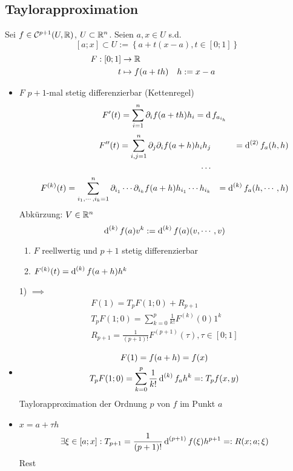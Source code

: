 \subsection{Taylorapproximation}
\begin{Bem}
  Sei $f\in\mathcal{C}^{p+1}(U,\mathbb{R})$, $U\subset\mathbb{R}^n$. Seien $a,x\in U$ s.d.
  \[[a;x]\subset U:=\left\{ a+t(x-a),t\in[0;1] \right\}\]
  \begin{align*}
    F:\left[ 0;1 \right]&\to\mathbb{R}\\
    t&\mapsto f(a+th) && h:=x-a
  \end{align*}
  \begin{itemize}
    \item 
      $F$ $p+1$-mal stetig differenzierbar (Kettenregel)
      \[F'(t)=\sum_{i=1}^n\partial_if(a+th)h_i=\operatorname{d} f_{a_{i_h}}\]
      \begin{align*}
        F''(t)=\sum_{i,j=1}^n\partial_j\partial_if(a+h)h_ih_j&&=\operatorname{d}^{(2)}f_a(h,h)\\
        \cdots\\
        F^{(k)}(t)=\sum^n_{i_1,\cdots,i_k=1}\partial_{i_1}\cdots\partial_{i_k}f(a+h)h_{i_1}\cdots h_{i_k} && =\operatorname{d}^{(k)}f_a(h,\cdots,h)
      \end{align*}
      Abkürzung: $V\in\mathbb{R}^n$
      \[\operatorname{d}^{(k)}f(a)v^k:=\operatorname{d}^{(k)}f(a)(v,\cdots,v)\]
      \begin{enumerate}
        \item $F$ reellwertig und $p+1$ stetig differenzierbar
        \item $F^{(k)}(t)=\operatorname{d}^{(k)}f(a+h)h^k$
      \end{enumerate}
      1) $\implies$
      \begin{gather*}
        F(1)=T_pF(1;0)+R_{p+1}\\
        T_pF(1;0)=\sum^p_{k=0}\frac{1}{k!}F^{(k)}(0)1^k\\
        R_{p+1}=\frac{1}{\left( p+1 \right)!}F^{(p+1)}(\tau), \tau\in [0;1]
      \end{gather*}
    \item 
      \begin{gather*}
        F(1)=f(a+h)=f(x)\\
        T_pF(1;0)=\sum^p_{k=0}\frac{1}{k!}\operatorname{d}^{(k)}f_ah^k=:T_pf(x,y)
      \end{gather*}
      Taylorapproximation der Ordnung $p$ von $f$ im Punkt $a$
    \item
      $x=a+\tau h$
      \[\exists\xi\in[a;x]:T_{p+1}=\frac{1}{(p+1)!}\operatorname{d}^{(p+1)}f(\xi)h^{p+1}=:R(x;a;\xi)\]
      Rest
  \end{itemize}
\end{Bem}
